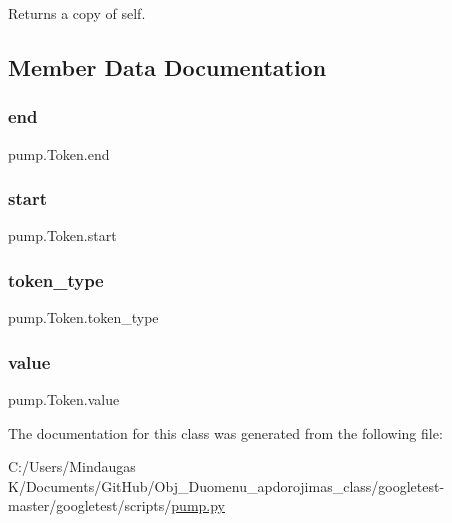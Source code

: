 \begin{DoxyVerb}Returns a copy of self.\end{DoxyVerb}
 

\subsection{Member Data Documentation}
\mbox{\label{classpump_1_1_token_abb88c0ece4274cfd974fd01d0468953c}} 
\subsubsection{\texorpdfstring{end}{end}}
{\footnotesize\ttfamily pump.\+Token.\+end}

\mbox{\label{classpump_1_1_token_a53e3333a770bc8773224a5af78bca5bb}} 
\subsubsection{\texorpdfstring{start}{start}}
{\footnotesize\ttfamily pump.\+Token.\+start}

\mbox{\label{classpump_1_1_token_aeac105b76f6af13c8c64ba0a94e37d90}} 
\subsubsection{\texorpdfstring{token\_type}{token\_type}}
{\footnotesize\ttfamily pump.\+Token.\+token\+\_\+type}

\mbox{\label{classpump_1_1_token_a5b7ab395a380b775b2bf0a8b0abfda86}} 
\subsubsection{\texorpdfstring{value}{value}}
{\footnotesize\ttfamily pump.\+Token.\+value}



The documentation for this class was generated from the following file\+:\begin{DoxyCompactItemize}
\item 
C\+:/\+Users/\+Mindaugas K/\+Documents/\+Git\+Hub/\+Obj\+\_\+\+Duomenu\+\_\+apdorojimas\+\_\+class/googletest-\/master/googletest/scripts/\mbox{\hyperlink{googletest-master_2googletest_2scripts_2pump_8py}{pump.\+py}}\end{DoxyCompactItemize}

